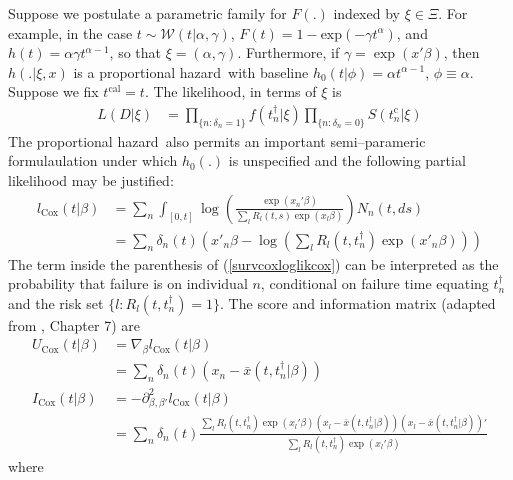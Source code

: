 \documentclass{article}
\newcommand{\tcal}{t^{\mathrm{cal}}}
\newcommand{\tfail}{t^{\dag}}
\newcommand{\tcens}{t^{\mathrm{c}}}
\newcommand{\tmin}{t^{*}}
\newcommand{\isfail}{\delta}
\newcommand{\atrisk}{R}
\newcommand{\unitcount}{N}
\newcommand{\survfullcov}{x}
\newcommand{\nentry}{n}
\newcommand{\nentries}{n_*}
\newcommand{\nfailed}{n_{\dag}}
\newcommand{\basehazard}{h_{0}}
\newcommand{\hazard}{h}
\newcommand{\surv}{S}
\newcommand{\coxloglik}{l_{\mathrm{Cox}}}
\newcommand{\coxscore}{U_{\mathrm{Cox}}}%
\newcommand{\coxinfo}{I_{\mathrm{Cox}}}
\newcommand{\survfulleffect}{\beta}
\newcommand{\survfullpar}{\xi}
\newcommand{\survbasepar}{\phi}
\newcommand{\ph}{proportional hazard}
\newcommand{\survcoxlogliksellke}{\sum_n \int_{[0,t]} 
\log\left(\frac{\exp(\survfullcov_\nentry'\beta)}{\sum_l R_l(t,s)\exp(\survfullcov_l\beta)}
\right)\unitcount_n(t,ds)}
\newcommand{\survcoxloglikcox}{\sum_n \isfail_\nentry(t) \left(\survfullcov'_\nentry\survfulleffect-\log\left(\sum_l  \atrisk_l(t,\tfail_\nentry) \exp(x'_\nentry\survfulleffect)\right)\right)
}
\begin{document}
Suppose we postulate a parametric family for $F(.)$ indexed by $\survfullpar\in\Xi$. For example, in the case $t\sim\mathcal{W}(t|\alpha,\gamma)$, $F(t)=1-\mathrm{exp}(-\gamma t^\alpha)$, and $\hazard(t)=\alpha \gamma t^{\alpha-1}$, so that  $\survfullpar=(\alpha,\gamma)$. Furthermore, if $\gamma=\exp(x'\survfulleffect)$, then $\hazard(.|\survfullpar,\survfullcov)$ is a \ph\ with baseline $\basehazard(t|\survbasepar)=\alpha t^{\alpha-1}$, $\phi\equiv\alpha$. Suppose we fix $\tcal=t$. The likelihood, in terms of $\survfullpar$ is %
\begin{align}\label{lik_surv_anal_param_1}
L(D|\survfullpar)&=\prod_{\{n:\isfail_\nentry=1\}} f(\tfail_n|\survfullpar)\prod_{\{\nentry:\isfail_\nentry=0\}} \surv(\tcens_n|\survfullpar)%
\end{align}
The \ph\ also permits an important semi--parameric formulaulation under which $\basehazard(.)$ is unspecified and the following partial likelihood\cite{sellke1983}
may be justified: 
\begin{align}\label{survcoxlogliksellke}
\coxloglik(t|\survfulleffect)&=\survcoxlogliksellke  %
\\\label{survcoxloglikcox}
&=\survcoxloglikcox
\end{align}%
The term inside the parenthesis of (\ref{survcoxloglikcox}) can be interpreted as the probability that failure is on individual $\nentry$, conditional on failure time equating $\tfail_\nentry$ and the risk set $\{l:\atrisk_l(t,\tfail_\nentry)=1\}$. %
The score and information matrix (adapted from \cite{lawless2002}, Chapter 7) are
\begin{align}\label{coxscore}
\coxscore(t|\survfulleffect)&=\nabla_{\survfulleffect} \coxloglik(t|\survfulleffect)\\\label{coxscore2}
&=\sum_{\nentry} \isfail_{\nentry}(t) (\survfullcov_\nentry-\bar x(t,\tfail_\nentry|\survfulleffect))\\
\label{coxinfo}
\coxinfo(t|\survfulleffect)&=-\partial_{\beta,\beta'}^2 \coxloglik(t|\survfulleffect)\\\label{coxinfo2}
&=\sum_\nentry \isfail_{\nentry}(t) \frac{\sum_l \atrisk_l(t,\tfail_\nentry)\exp(\survfullcov_l'\survfulleffect)(\survfullcov_l-\bar \survfullcov(t,\tfail_\nentry|\survfulleffect))(\survfullcov_l-\bar \survfullcov(t,\tfail_\nentry|\survfulleffect))'}{\sum_l \atrisk_l(t,\tfail_\nentry)\exp(\survfullcov_l'\survfulleffect)}
\end{align}where
\end{document}

